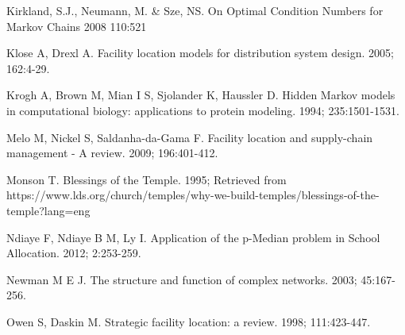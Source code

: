 \documentclass[twoside,twocolumn]{article}
\begin{document}
\begin{thebibliography}{99}
Kirkland, S.J., Neumann, M. \& Sze, NS.
\newblock On Optimal Condition Numbers for Markov Chains
 2008 110:521

Klose A, Drexl A.
\newblock Facility location models for distribution system design.
 2005; 162:4-29.

Krogh A, Brown M, Mian I S, Sjolander K, Haussler D.
\newblock Hidden Markov models in computational biology: applications to protein modeling.
 1994; 235:1501-1531.

Melo M, Nickel S, Saldanha-da-Gama F.
\newblock Facility location and supply-chain management - A review.
  2009; 196:401-412.

Monson T.
\newblock Blessings of the Temple. 1995;
\newblock Retrieved from https://www.lds.org/church/temples/why-we-build-temples/blessings-of-the-temple?lang=eng

Ndiaye F, Ndiaye B M, Ly I.
\newblock Application of the p-Median problem in School Allocation.
 2012; 2:253-259.

Newman M E J.
\newblock The structure and function of complex networks.
 2003; 45:167-256.

Owen S, Daskin M.
\newblock Strategic facility location: a review.
 1998; 111:423-447.

\end{thebibliography}
\end{document}
